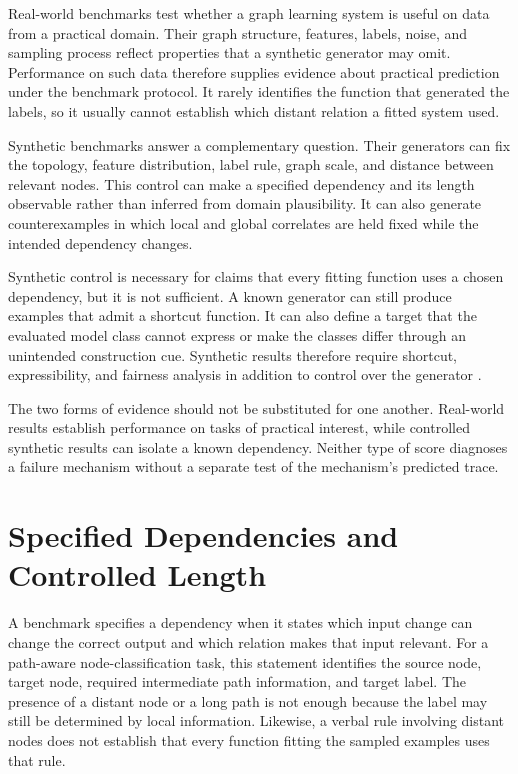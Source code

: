 Real-world benchmarks test whether a graph learning system is useful on data from a practical domain.
Their graph structure, features, labels, noise, and sampling process reflect properties that a synthetic generator may omit.
Performance on such data therefore supplies evidence about practical prediction under the benchmark protocol.
It rarely identifies the function that generated the labels, so it usually cannot establish which distant relation a fitted system used.

Synthetic benchmarks answer a complementary question.
Their generators can fix the topology, feature distribution, label rule, graph scale, and distance between relevant nodes.
This control can make a specified dependency and its length observable rather than inferred from domain plausibility.
It can also generate counterexamples in which local and global correlates are held fixed while the intended dependency changes.

Synthetic control is necessary for claims that every fitting function uses a chosen dependency, but it is not sufficient.
A known generator can still produce examples that admit a shortcut function.
It can also define a target that the evaluated model class cannot express or make the classes differ through an unintended construction cue.
Synthetic results therefore require shortcut, expressibility, and fairness analysis in addition to control over the generator \cite{zhou2025glora}.

The two forms of evidence should not be substituted for one another.
Real-world results establish performance on tasks of practical interest, while controlled synthetic results can isolate a known dependency.
Neither type of score diagnoses a failure mechanism without a separate test of the mechanism's predicted trace.

\section{Specified Dependencies and Controlled Length}

A benchmark specifies a dependency when it states which input change can change the correct output and which relation makes that input relevant.
For a path-aware node-classification task, this statement identifies the source node, target node, required intermediate path information, and target label.
The presence of a distant node or a long path is not enough because the label may still be determined by local information.
Likewise, a verbal rule involving distant nodes does not establish that every function fitting the sampled examples uses that rule.

